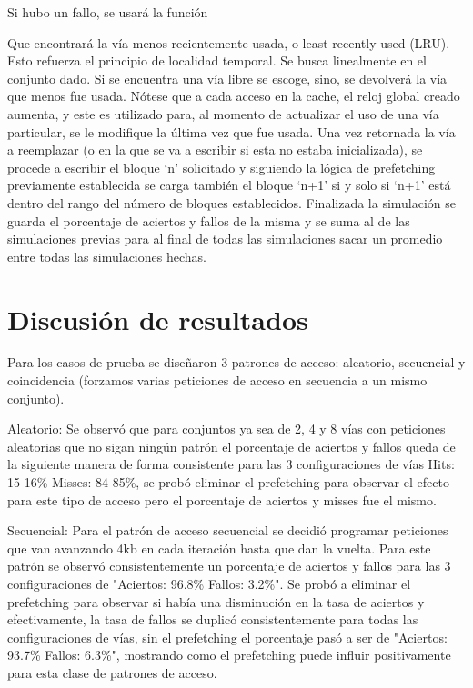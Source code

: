 \documentclass[11pt,letterpaper]{article}
\newcommand{\codigo}[1]{\par\noindent{\ttfamily\small\raggedright\detokenize{#1}\par}}
\begin{document}
Si hubo un fallo, se usará la función

\codigo{int encontrar_via_lru(const tipo_conjunto& conjunto)}

Que encontrará la vía menos recientemente usada, o least recently used (LRU). Esto refuerza el principio de localidad temporal. Se busca linealmente en el conjunto dado. Si se encuentra una vía libre se escoge, sino, se devolverá la vía que menos fue usada. Nótese que a cada acceso en la cache, el reloj global creado aumenta, y este es utilizado para, al momento de actualizar el uso de una vía particular, se le modifique la última vez que fue usada. Una vez retornada la vía a reemplazar (o en la que se va a escribir si esta no estaba inicializada), se procede a escribir el bloque `n' solicitado y siguiendo la lógica de prefetching previamente establecida se carga también el bloque `n+1' si y solo si `n+1' está dentro del rango del número de bloques establecidos. Finalizada la simulación se guarda el porcentaje de aciertos y fallos de la misma y se suma al de las simulaciones previas para al final de todas las simulaciones sacar un promedio entre todas las simulaciones hechas.

\section*{Discusión de resultados}
Para los casos de prueba se diseñaron 3 patrones de acceso: aleatorio, secuencial y coincidencia (forzamos varias peticiones de acceso en secuencia a un mismo conjunto).

Aleatorio: Se observó que para conjuntos ya sea de 2, 4 y 8 vías con peticiones aleatorias que no sigan ningún patrón el porcentaje de aciertos y fallos queda de la siguiente manera de forma consistente para las 3 configuraciones de vías Hits: 15-16\% \quad Misses: 84-85\%, se probó eliminar el prefetching para observar el efecto para este tipo de acceso pero el porcentaje de aciertos y misses fue el mismo.

Secuencial: Para el patrón de acceso secuencial se decidió programar peticiones que van avanzando 4kb en cada iteración hasta que dan la vuelta. Para este patrón se observó consistentemente un porcentaje de aciertos y fallos para las 3 configuraciones de "Aciertos: 96.8\% \quad Fallos: 3.2\%". Se probó a eliminar el prefetching para observar si había una disminución en la tasa de aciertos y efectivamente, la tasa de fallos se duplicó consistentemente para todas las configuraciones de vías, sin el prefetching el porcentaje pasó a ser de "Aciertos: 93.7\% \quad Fallos: 6.3\%", mostrando como el prefetching puede influir positivamente para esta clase de patrones de acceso.
\end{document}
